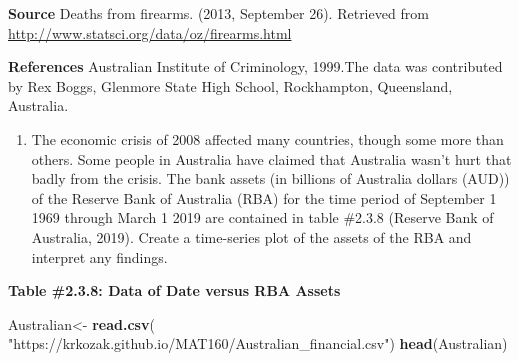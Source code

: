 \documentclass[
]{book}
\newenvironment{Shaded}{\begin{snugshade}}{\end{snugshade}}
\newcommand{\KeywordTok}[1]{\textcolor[rgb]{0.13,0.29,0.53}{\textbf{#1}}}
\newcommand{\NormalTok}[1]{#1}
\newcommand{\StringTok}[1]{\textcolor[rgb]{0.31,0.60,0.02}{#1}}
\providecommand{\tightlist}{%
  \setlength{\itemsep}{0pt}\setlength{\parskip}{0pt}}
\begin{document}
\textbf{Source}
Deaths from firearms. (2013, September 26). Retrieved from
\url{http://www.statsci.org/data/oz/firearms.html}

\textbf{References}
Australian Institute of Criminology, 1999.The data was contributed by Rex Boggs, Glenmore State High School, Rockhampton, Queensland, Australia.

\begin{enumerate}
\def\labelenumi{\arabic{enumi}.}
\setcounter{enumi}{5}
\tightlist
\item
  The economic crisis of 2008 affected many countries, though some more than others. Some people in Australia have claimed that Australia wasn't hurt that badly from the crisis. The bank assets (in billions of Australia dollars (AUD)) of the Reserve Bank of Australia (RBA) for the time period of September 1 1969 through March 1 2019 are contained in table \#2.3.8 (Reserve Bank of Australia, 2019). Create a time-series plot of the assets of the RBA and interpret any findings.
\end{enumerate}

\textbf{Table \#2.3.8: Data of Date versus RBA Assets}

\begin{Shaded}
\begin{Highlighting}[]
\NormalTok{Australian<-}\StringTok{ }\KeywordTok{read.csv}\NormalTok{(}
  \StringTok{"https://krkozak.github.io/MAT160/Australian_financial.csv"}\NormalTok{)}
\KeywordTok{head}\NormalTok{(Australian)}
\end{Highlighting}
\end{Shaded}
\end{document}
